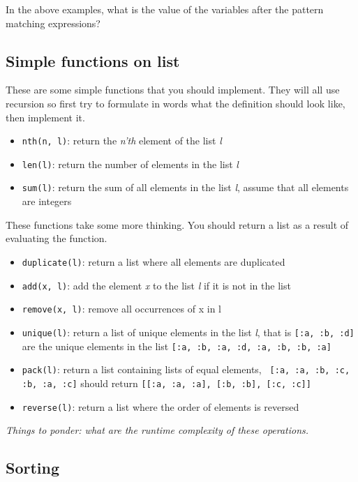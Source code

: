 \documentclass[a4paper,11pt]{article}
\begin{document}
In the above examples, what is the value of the variables after the
pattern matching expressions?

\subsection{Simple functions on list}

These are some simple functions that you should implement. They will
all use recursion so first try to formulate in words what the
definition should look like, then implement it.

\begin{itemize}
\item {\tt nth(n, l)}: return the {\em n'th} element of the list {\em l}
\item {\tt len(l)}: return the number of elements in the list  {\em l}
\item {\tt sum(l)}: return the sum of all elements in the list  {\em l}, assume
  that all elements are integers
\end{itemize}

These functions take some more thinking. You should return a list as a
result of evaluating the function.

\begin{itemize}
\item {\tt duplicate(l)}: return a list where all elements are duplicated
\item {\tt add(x, l)}: add the element {\em x} to the list {\em l} if it is not in the list
\item {\tt remove(x, l)}: remove all occurrences of x in l 
\item {\tt unique(l)}: return a list of unique elements in the list {\em l},
  that is {\tt [:a, :b, :d]} are the unique elements in the list {\tt [:a, :b, :a, :d, :a, :b, :b, :a]}
\item {\tt pack(l)}: return a list containing lists of equal elements, {\tt
  [:a, :a, :b, :c, :b, :a, :c]} should return {\tt [[:a, :a, :a], [:b, :b], [:c, :c]]}
\item {\tt reverse(l)}: return a list where the order of elements is reversed
\end{itemize}

{\em Things to ponder: what are the runtime complexity of these operations.}

\subsection{Sorting}
\end{document}
